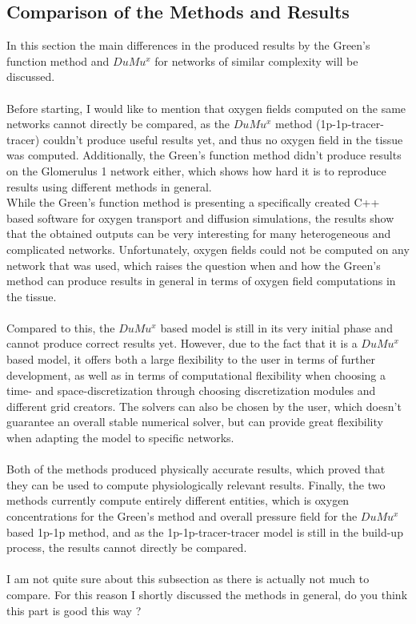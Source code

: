 \subsection{Comparison of the Methods and Results}
In this section the main differences in the produced results by the Green's function method and $DuMu^x$ for networks of similar complexity will be discussed.\\
\\Before starting, I would like to mention that oxygen fields computed on the same networks cannot directly be compared, as the $DuMu^x$ method (1p-1p-tracer-tracer) couldn't produce useful results yet, and thus no oxygen field in the tissue was computed. Additionally, the Green's function method didn't produce results on the Glomerulus 1 network either, which shows how hard it is to reproduce results using different methods in general.\\
While the Green's function method is presenting a specifically created C++ based software for oxygen transport and diffusion simulations, the results show that the obtained outputs can be very interesting for many heterogeneous and complicated networks. Unfortunately, oxygen fields could not be computed on any network that was used, which raises the question when and how the Green's method can produce results in general in terms of oxygen field computations in the tissue.\\
\\Compared to this, the $DuMu^x$ based model is still in its very initial phase and cannot produce correct results yet. However, due to the fact that it is a $DuMu^x$ based model, it offers both a large flexibility to the user in terms of further development, as well as in terms of computational flexibility when choosing a time- and space-discretization through choosing discretization modules and different grid creators. The solvers can also be chosen by the user, which doesn't guarantee an overall stable numerical solver, but can provide great flexibility when adapting the model to specific networks.\\
\\Both of the methods produced physically accurate results, which proved that they can be used to compute physiologically relevant results. Finally, the two methods currently compute entirely different entities, which is oxygen concentrations for the Green's method and overall pressure field for the $DuMu^x$ based 1p-1p method, and as the 1p-1p-tracer-tracer model is still in the build-up process, the results cannot directly be compared.
\\
\\ {\color{red} I am not quite sure about this subsection as there is actually not much to compare. For this reason I shortly discussed the methods in general, do you think this part is good this way ?}

